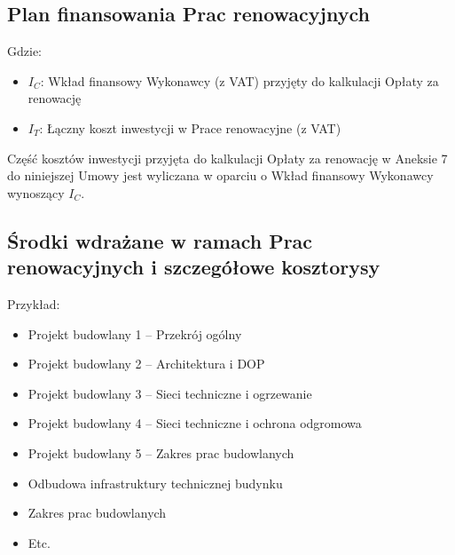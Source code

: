 
\subsection{Plan finansowania Prac renowacyjnych}
\begin{center}
\end{center}

Gdzie:
\begin{itemize}
	\item $I_C$: Wkład finansowy Wykonawcy (z VAT) przyjęty do kalkulacji Opłaty za renowację
	\item $I_T$: Łączny koszt inwestycji w Prace renowacyjne (z VAT)
\end{itemize}

  Część kosztów inwestycji przyjęta do kalkulacji Opłaty za renowację w Aneksie 7 do niniejszej Umowy jest wyliczana w oparciu o Wkład finansowy Wykonawcy wynoszący $I_C$.

\subsection{Środki wdrażane w ramach Prac renowacyjnych i szczegółowe kosztorysy}

Przykład:

\begin{itemize}
	\item Projekt budowlany 1 – Przekrój ogólny
	\item Projekt budowlany 2 – Architektura i DOP
	\item Projekt budowlany 3 – Sieci techniczne i ogrzewanie
	\item Projekt budowlany 4 – Sieci techniczne i ochrona odgromowa
	\item Projekt budowlany 5 – Zakres prac budowlanych
	\item Odbudowa infrastruktury technicznej budynku
	\item Zakres prac budowlanych
	\item Etc.
\end{itemize}
